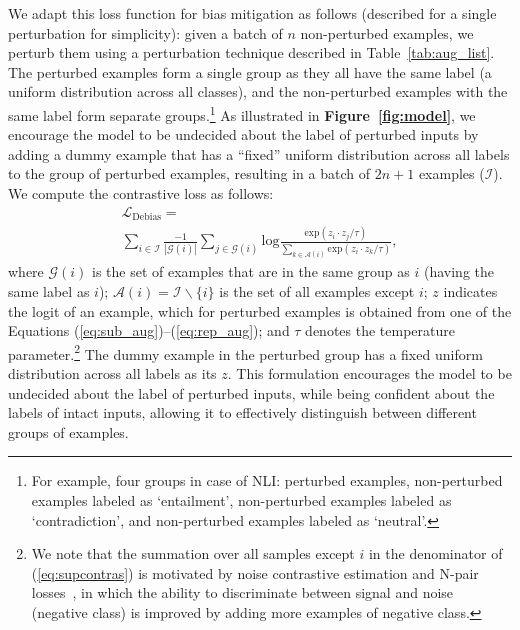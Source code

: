 We adapt this loss function for bias mitigation as follows (described for a single perturbation for simplicity):
given a batch of $n$ non-perturbed examples, we perturb them using a perturbation technique described in Table~\ref{tab:aug_list}. The perturbed examples form a single group as they all have the same label (a uniform distribution across all classes), and the non-perturbed examples with the same label form separate groups.\footnote{For example, four groups in case of NLI: perturbed examples, non-perturbed examples labeled as `entailment', non-perturbed examples labeled as `contradiction', and non-perturbed examples labeled as `neutral'.} 
As illustrated in \textbf{Figure~\ref{fig:model}}, we encourage the model to be undecided about the label of perturbed inputs by adding a dummy example that has a ``fixed'' uniform distribution across all labels to the group of perturbed examples, resulting in a batch of $2n+1$ examples ($\mathcal{I}$). We compute the contrastive loss as follows:
\begin{multline}
\label{eq:supcontras}
    \mathcal{L}_{\mathrm{Debias}} = \\ 
    \sum_{i \in \mathcal{I}} \frac{-1}{|\mathcal{G}(i)|} \sum_{j \in \mathcal{G}(i)} \mathrm{log} \frac{\mathrm{exp} (z_i \cdot z_j / \tau)}{\sum_{k \in \mathcal{A}(i)} \mathrm{exp} (z_i \cdot z_k / \tau)},
\end{multline}
where $\mathcal{G}(i)$ is the set of examples that are in the same group as $i$ (having the same label as $i$); 
$\mathcal{A}(i) = \mathcal{I}\backslash\{i\}$ is the set of all examples except $i$; 
$z$ indicates the logit of an example, which for perturbed examples is obtained from one of the Equations (\ref{eq:sub_aug})--(\ref{eq:rep_aug}); and 
$\tau$ denotes the temperature parameter.\footnote{We note that the summation over all samples except $i$ in the denominator of (\ref{eq:supcontras}) is motivated by noise contrastive estimation and N-pair losses~\citep{khosla2020supervised,pmlr-v9-gutmann10a,NIPS2016_6b180037}, in which the ability to discriminate between signal and noise (negative class) is improved by adding more examples of negative class.} The dummy example in the perturbed group has a fixed uniform distribution across all labels as its $z$. This formulation encourages the model to be undecided about the label of perturbed inputs, while being confident about the labels of intact inputs, allowing it to effectively distinguish between different groups of examples. 

